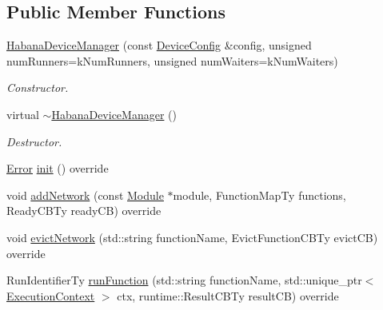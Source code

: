 \subsection*{Public Member Functions}
\begin{DoxyCompactItemize}
\item 
\mbox{\label{classglow_1_1runtime_1_1_habana_device_manager_af813436dab0903d1a60a0ffa8b425bc5}} 
\hyperlink{classglow_1_1runtime_1_1_habana_device_manager_af813436dab0903d1a60a0ffa8b425bc5}{Habana\+Device\+Manager} (const \hyperlink{structglow_1_1runtime_1_1_device_config}{Device\+Config} \&config, unsigned num\+Runners=k\+Num\+Runners, unsigned num\+Waiters=k\+Num\+Waiters)
\begin{DoxyCompactList}\small\item\em Constructor. \end{DoxyCompactList}\item 
\mbox{\label{classglow_1_1runtime_1_1_habana_device_manager_a7230c8d879e16c469c9dd318bc061946}} 
virtual \hyperlink{classglow_1_1runtime_1_1_habana_device_manager_a7230c8d879e16c469c9dd318bc061946}{$\sim$\+Habana\+Device\+Manager} ()
\begin{DoxyCompactList}\small\item\em Destructor. \end{DoxyCompactList}\item 
\hyperlink{namespaceglow_afdb176c3a672ef66db0ecfc19a8d39bf}{Error} \hyperlink{classglow_1_1runtime_1_1_habana_device_manager_af5d6a6e9e3ee7a71356e63c89cda50be}{init} () override
\item 
void \hyperlink{classglow_1_1runtime_1_1_habana_device_manager_ac812a0a4b70e788e13255ad144bf792f}{add\+Network} (const \hyperlink{classglow_1_1_module}{Module} $\ast$module, Function\+Map\+Ty functions, Ready\+C\+B\+Ty ready\+CB) override
\item 
void \hyperlink{classglow_1_1runtime_1_1_habana_device_manager_a142fa73f19c5731a522a40c2646c070e}{evict\+Network} (std\+::string function\+Name, Evict\+Function\+C\+B\+Ty evict\+CB) override
\item 
Run\+Identifier\+Ty \hyperlink{classglow_1_1runtime_1_1_habana_device_manager_a345fedf5deacdb44274ed92de5dcc962}{run\+Function} (std\+::string function\+Name, std\+::unique\+\_\+ptr$<$ \hyperlink{classglow_1_1_execution_context}{Execution\+Context} $>$ ctx, runtime\+::\+Result\+C\+B\+Ty result\+CB) override

\end{DoxyCompactItemize}
